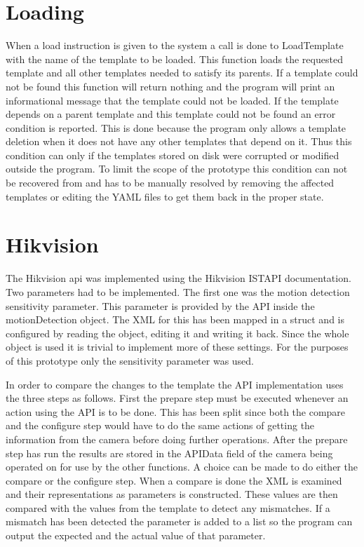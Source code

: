 \section{Loading}
When a load instruction is given to the system a call is done to LoadTemplate with the name of the template to be loaded.
This function loads the requested template and all other templates needed to satisfy its parents.
If a template could not be found this function will return nothing and the program will print an informational message that the template could not be loaded.
If the template depends on a parent template and this template could not be found an error condition is reported.
This is done because the program only allows a template deletion when it does not have any other templates that depend on it.
Thus this condition can only if the templates stored on disk were corrupted or modified outside the program.
To limit the scope of the prototype this condition can not be recovered from and has to be manually resolved by removing the affected templates or editing the YAML files to get them back in the proper state.

\section{Hikvision}
The Hikvision api was implemented using the Hikvision ISTAPI documentation\cite{noauthor_intelligent_nodate}.
Two parameters had to be implemented.
The first one was the motion detection sensitivity parameter.
This parameter is provided by the API inside the motionDetection object.
The XML for this has been mapped in a struct and is configured by reading the object, editing it and writing it back.
Since the whole object is used it is trivial to implement more of these settings.
For the purposes of this prototype only the sensitivity parameter was used.


In order to compare the changes to the template the API implementation uses the three steps as follows.
First the prepare step must be executed whenever an action using the API is to be done.
This has been split since both the compare and the configure step would have to do the same actions of getting the information from the camera before doing further operations.
After the prepare step has run the results are stored in the APIData field of the camera being operated on for use by the other functions.
A choice can be made to do either the compare or the configure step.
When a compare is done the XML is examined and their representations as parameters is constructed.
These values are then compared with the values from the template to detect any mismatches.
If a mismatch has been detected the parameter is added to a list so the program can output the expected and the actual value of that parameter.

